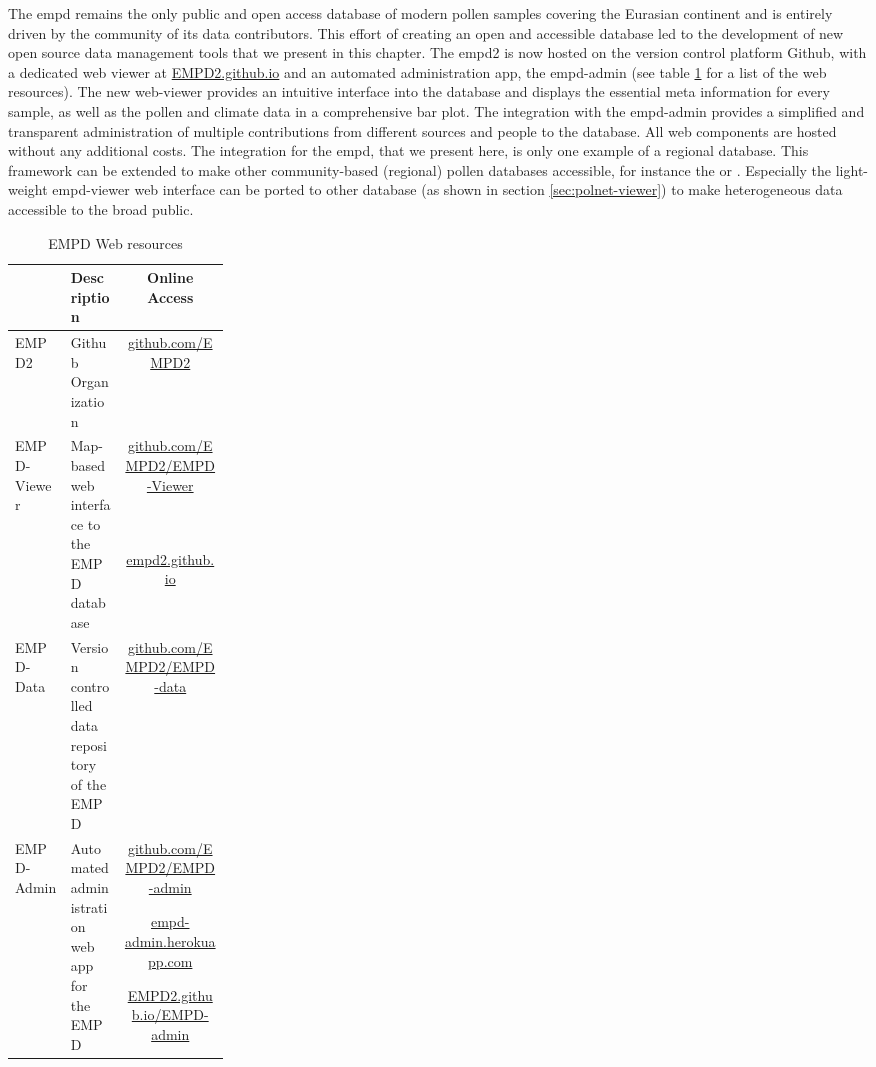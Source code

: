 \begin{refsection}
The \gls{empd} remains the only public and open access database of modern pollen samples covering the Eurasian continent and is entirely driven by the community of its data contributors. This effort of creating an open and accessible database led to the development of new open source data management tools that we present in this chapter. The \gls{empd}2 is now hosted on the version control platform Github, with a dedicated web viewer at \href{https://EMPD2.github.io}{EMPD2.github.io} and an automated administration app, the \gls{empd}-admin (see table \ref{tab:empd-links} for a list of the web resources). The new web-viewer provides an intuitive interface into the database and displays the essential meta information for every sample, as well as the pollen and climate data in a comprehensive bar plot. The integration with the \gls{empd}-admin provides a simplified and transparent administration of multiple contributions from different sources and people to the database. All web components are hosted without any additional costs. The integration for the \gls{empd}, that we present here, is only one example of a regional database. This framework can be extended to make other community-based (regional) pollen databases accessible, for instance the  \citep{FlantuaHooghiemstraGrimmEtAl2015} or  \citep{VincensLezineBuchetEtAl2007}. Especially the light-weight \gls{empd}-viewer web interface can be ported to other database (as shown in section \ref{sec:polnet-viewer}) to make heterogeneous data accessible to the broad public.

\begin{table}
	\caption{EMPD Web resources}
	\label{tab:empd-links}
	\begin{tabular}{|l|p{0.25\linewidth}|c|}
		\hline 
		& Description & Online Access \\ 
		\hline
		EMPD2 & Github Organization & \href{https://github.com/EMPD2}{github.com/EMPD2} \\
		\hline 
		\multirow{3}{*}{EMPD-Viewer} & \multirow{3}{\linewidth}{Map-based web interface to the EMPD database} & \href{https://github.com/EMPD2/EMPD-viewer}{github.com/EMPD2/EMPD-Viewer} \\
		& & \href{https://empd2.github.io/}{empd2.github.io} \\
		& & \\
		\hline 
		\multirow{3}{*}{EMPD-Data} & \multirow{3}{\linewidth}{Version controlled data repository of the EMPD} & \href{https://github.com/EMPD2/EMPD-data}{github.com/EMPD2/EMPD-data}  \\ 
		& & \\
		& & \\
		\hline 
		\multirow{3}{*}{EMPD-Admin} &  \multirow{3}{\linewidth}{Automated administration web app for the EMPD} & \href{https://github.com/EMPD2/EMPD-admin}{github.com/EMPD2/EMPD-admin} \\ 
		& & \href{https://empd-admin.herokuapp.com/}{empd-admin.herokuapp.com} \\ 
		& & \href{https://EMPD2.github.io/EMPD-admin}{EMPD2.github.io/EMPD-admin} \\ 
		\hline 
	\end{tabular} 
\end{table}


\end{refsection}
